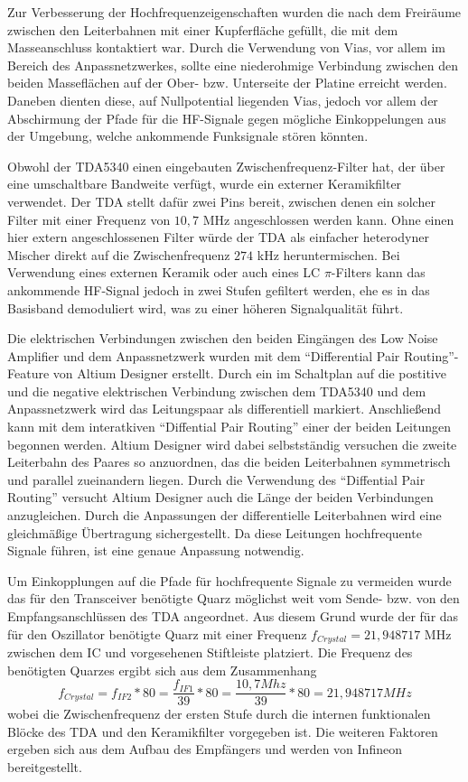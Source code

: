 Zur Verbesserung der Hochfrequenzeigenschaften wurden die nach dem Freiräume zwischen den Leiterbahnen mit einer Kupferfläche gefüllt, die mit dem Masseanschluss kontaktiert war. Durch die Verwendung von Vias, vor allem im Bereich des Anpassnetzwerkes, sollte eine niederohmige Verbindung zwischen den beiden Masseflächen auf der Ober- bzw. Unterseite der Platine erreicht werden. Daneben dienten diese, auf Nullpotential liegenden Vias, jedoch vor allem der Abschirmung der Pfade für die HF-Signale gegen mögliche Einkoppelungen aus der Umgebung, welche ankommende Funksignale stören könnten.

Obwohl der TDA5340 einen eingebauten Zwischenfrequenz-Filter hat, der über eine umschaltbare Bandweite verfügt, wurde ein externer Keramikfilter verwendet. Der TDA stellt dafür zwei Pins bereit, zwischen denen ein solcher Filter mit einer Frequenz von  $10,7$ MHz angeschlossen werden kann. Ohne einen hier extern angeschlossenen Filter würde der TDA als einfacher heterodyner Mischer direkt auf die Zwischenfrequenz $274$ kHz heruntermischen. Bei Verwendung eines externen Keramik oder auch eines LC $\pi$-Filters kann das ankommende HF-Signal jedoch in zwei Stufen gefiltert werden, ehe es in das Basisband demoduliert wird, was zu einer höheren Signalqualität führt.%

Die elektrischen Verbindungen zwischen den beiden Eingängen des Low Noise Amplifier und dem Anpassnetzwerk wurden mit dem \enquote{Differential Pair Routing}-Feature von Altium Designer erstellt. Durch ein im Schaltplan auf die postitive und die negative elektrischen Verbindung zwischen dem TDA5340 und dem Anpassnetzwerk wird das Leitungspaar als differentiell markiert. Anschließend kann mit dem interatkiven \enquote{Diffential Pair Routing} einer der beiden Leitungen begonnen werden. Altium Designer wird dabei selbstständig versuchen die zweite Leiterbahn des Paares so anzuordnen, das die beiden Leiterbahnen symmetrisch und parallel zueinandern liegen. %
Durch die Verwendung des \enquote{Diffential Pair Routing} versucht Altium Designer auch die Länge der beiden Verbindungen anzugleichen. Durch die Anpassungen der differentielle Leiterbahnen wird eine gleichmäßige Übertragung sichergestellt. Da diese Leitungen hochfrequente Signale führen, ist eine genaue Anpassung notwendig.


Um Einkopplungen auf die Pfade für hochfrequente Signale zu vermeiden wurde das für den Transceiver benötigte Quarz möglichst weit vom Sende- bzw. von den Empfangsanschlüssen des TDA angeordnet. Aus diesem Grund wurde der für das für den Oszillator benötigte Quarz mit einer Frequenz $f_{Crystal}=21,948717$ MHz zwischen dem IC und vorgesehenen Stiftleiste platziert.  Die Frequenz des benötigten Quarzes ergibt sich aus dem  Zusammenhang
\begin{equation}\label{eq:fsys}
f_{Crystal} = f_{IF2} * 80 = \frac{f_{IF1}}{39} * 80  = \frac{10,7 Mhz}{39} * 80 = 21,948717 MHz
\end{equation}
wobei die Zwischenfrequenz der ersten Stufe durch die internen funktionalen Blöcke des TDA und den Keramikfilter vorgegeben ist. Die weiteren Faktoren ergeben sich aus dem Aufbau des Empfängers und werden von Infineon bereitgestellt. %

